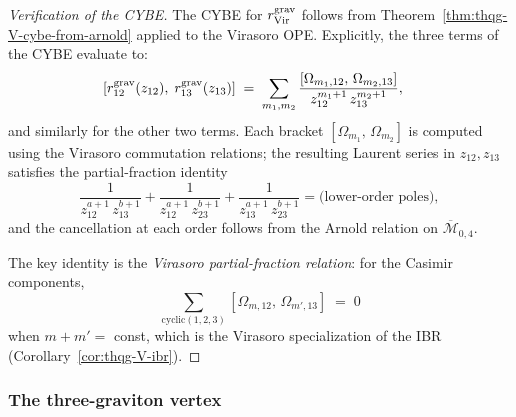 \begin{proof}[Verification of the CYBE]
The CYBE for $r^{\mathrm{grav}}_{\mathrm{Vir}}$ follows from
Theorem~\ref{thm:thqg-V-cybe-from-arnold} applied to the Virasoro
OPE. Explicitly, the three terms of the CYBE evaluate to:
\begin{align}
&[r^{\mathrm{grav}}_{12}(z_{12}),\;r^{\mathrm{grav}}_{13}(z_{13})]
\;=\;
\sum_{m_1,m_2}
\frac{[\Omega_{m_1,12},\,\Omega_{m_2,13}]}
 {z_{12}^{m_1+1}\,z_{13}^{m_2+1}},
\label{eq:thqg-V-vir-cybe-1}
\end{align}
and similarly for the other two terms. Each bracket
$[\Omega_{m_1},\,\Omega_{m_2}]$ is computed using the Virasoro
commutation relations; the resulting Laurent series in $z_{12}, z_{13}$
satisfies the partial-fraction identity
\[
\frac{1}{z_{12}^{a+1}\,z_{13}^{b+1}}
+
\frac{1}{z_{12}^{a+1}\,z_{23}^{b+1}}
+
\frac{1}{z_{13}^{a+1}\,z_{23}^{b+1}}
=
\text{(lower-order poles)},
\]
and the cancellation at each order follows from the Arnold relation
on $\overline{\mathcal{M}}_{0,4}$.

The key identity is the \emph{Virasoro partial-fraction relation}:
for the Casimir components,
\begin{equation}\label{eq:thqg-V-vir-partial-fraction}
\sum_{\text{cyclic}(1,2,3)}
[\Omega_{m,12},\,\Omega_{m',13}]
\;=\;
0
\end{equation}
when $m + m' = $ const, which is the Virasoro
specialization of the IBR
(Corollary~\ref{cor:thqg-V-ibr}).
\end{proof}


\subsubsection{The three-graviton vertex}

